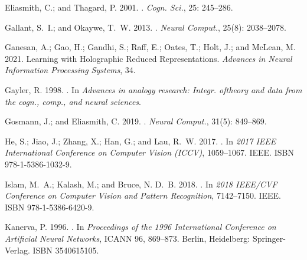 \documentclass[letterpaper]{article} %
\begin{document}
\begin{thebibliography}{33}
    Eliasmith, C.; and Thagard, P. 2001.
    .
    \newblock \emph{Cogn. Sci.}, 25: 245--286.

    Gallant, S.~I.; and Okaywe, T.~W. 2013.
    .
    \newblock \emph{Neural Comput.}, 25(8): 2038–2078.

    Ganesan, A.; Gao, H.; Gandhi, S.; Raff, E.; Oates, T.; Holt, J.; and McLean, M.
      2021.
    \newblock Learning with Holographic Reduced Representations.
    \newblock \emph{Advances in Neural Information Processing Systems}, 34.

    Gayler, R. 1998.
    .
    \newblock In \emph{Advances in analogy research: Integr. oftheory and data from
      the cogn., comp., and neural sciences}.

    Gosmann, J.; and Eliasmith, C. 2019.
    .
    \newblock \emph{Neural Comput.}, 31(5): 849--869.

    He, S.; Jiao, J.; Zhang, X.; Han, G.; and Lau, R.~W. 2017.
    .
    \newblock In \emph{2017 IEEE International Conference on Computer Vision
      (ICCV)}, 1059--1067. IEEE.
    \newblock ISBN 978-1-5386-1032-9.

    Islam, M.~A.; Kalash, M.; and Bruce, N. D.~B. 2018.
    .
    \newblock In \emph{2018 IEEE/CVF Conference on Computer Vision and Pattern
      Recognition}, 7142--7150. IEEE.
    \newblock ISBN 978-1-5386-6420-9.

    Kanerva, P. 1996.
    .
    \newblock In \emph{Proceedings of the 1996 International Conference on
      Artificial Neural Networks}, ICANN 96, 869–873. Berlin, Heidelberg:
      Springer-Verlag.
    \newblock ISBN 3540615105.


\end{thebibliography}
\end{document}
